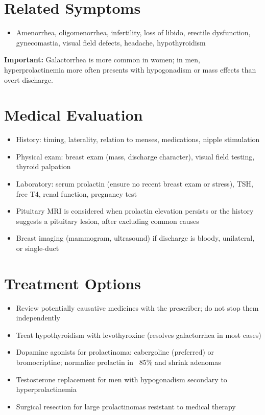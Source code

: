 \section*{Related Symptoms}
\begin{itemize}
  \item Amenorrhea, oligomenorrhea, infertility, loss of libido, erectile dysfunction, gynecomastia, visual field defects, headache, hypothyroidism
\end{itemize}
\textbf{Important:} Galactorrhea is more common in women; in men, hyperprolactinemia more often presents with hypogonadism or mass effects than overt discharge.

\section*{Medical Evaluation}
\begin{itemize}
  \item History: timing, laterality, relation to menses, medications, nipple stimulation
  \item Physical exam: breast exam (mass, discharge character), visual field testing, thyroid palpation
  \item Laboratory: serum prolactin (ensure no recent breast exam or stress), TSH, free T4, renal function, pregnancy test
  \item Pituitary MRI is considered when prolactin elevation persists or the history suggests a pituitary lesion, after excluding common causes
  \item Breast imaging (mammogram, ultrasound) if discharge is bloody, unilateral, or single-duct
\end{itemize}

\section*{Treatment Options}
\begin{itemize}
  \item Review potentially causative medicines with the prescriber; do not stop them independently
  \item Treat hypothyroidism with levothyroxine (resolves galactorrhea in most cases)
  \item Dopamine agonists for prolactinoma: cabergoline (preferred) or bromocriptine; normalize prolactin in ~85\% and shrink adenomas
  \item Testosterone replacement for men with hypogonadism secondary to hyperprolactinemia
  \item Surgical resection for large prolactinomas resistant to medical therapy
\end{itemize}


